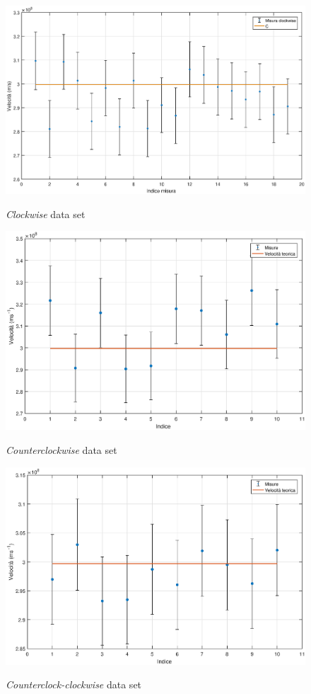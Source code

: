 \documentclass[a4paper,11pt]{article}
\begin{document}
	\begin{figure}
		\centering
		\caption{\emph{Clockwise} data set}
		\includegraphics[width=.98\textwidth]{Clockwiseplot}
		\label{fig:clockwiseplot}
	\end{figure}
	

	\begin{figure}
		\centering
		\caption{\emph{Counterclockwise} data set}
		\includegraphics[width=.98\textwidth]{Counterclockwiseplot}
		\label{fig:counterclockwiseplot}
	\end{figure}
	
	\begin{figure}
		\centering
		\caption{\emph{Counterclock-clockwise} data set}
		\includegraphics[width=.98\textwidth]{Clock-anticlockplot}
		\label{fig:clock-anticlockplot}
	\end{figure}
	\newpage
\end{document}
